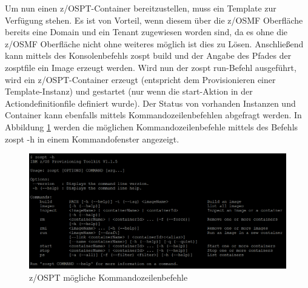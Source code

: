 Um nun einen z/OSPT-Container bereitzustellen, muss ein Template zur Verfügung stehen.
Es ist von Vorteil, wenn diesem über die z/OSMF Oberfläche bereits eine Domain und ein Tenant zugewiesen worden sind, da es ohne die z/OSMF Oberfläche nicht ohne weiteres möglich ist dies zu Lösen.
Anschließend kann mittels des Konsolenbefehls \glqq zospt build\grqq{} und der Angabe des Pfades der zosptfile ein Image erzeugt werden.
Wird nun der \glqq zospt run\grqq-Befehl ausgeführt, wird ein z/OSPT-Container erzeugt (entspricht dem Provisionieren einer Template-Instanz) und gestartet (nur wenn die start-Aktion in der Actiondefinitionfile definiert wurde).
Der Status von vorhanden Instanzen und Container kann ebenfalls mittels Kommandozeilenbefehlen abgefragt werden.
\cite{IBM.2019b}
In Abbildung \ref{fig:zospt_help} werden die möglichen Kommandozeilenbefehle mittels des Befehls \glqq zospt -h\grqq{} in einem Kommandofenster angezeigt. 
\begin{figure}[h]
	\centering
	\includegraphics[width=\textwidth]{figures/zospt_help_putty.png}
	\caption{z/OSPT mögliche Kommandozeilenbefehle}
	\label{fig:zospt_help}
\end{figure}
